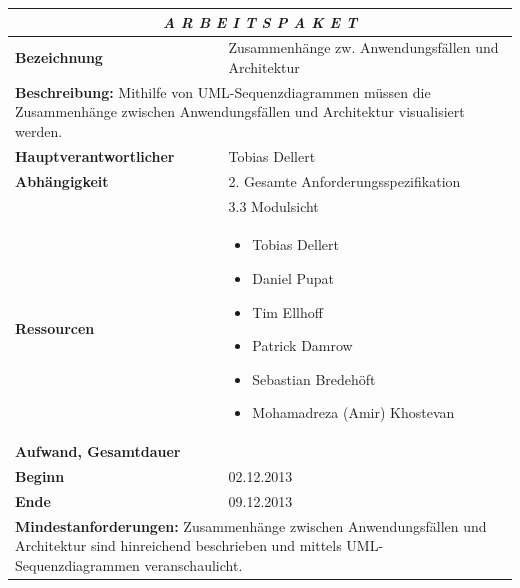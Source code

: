 \documentclass[fontsize=12pt,paper=a4,twoside]{scrartcl}
\begin{document}
\begin{tabular}{p{7.5cm}|p{7.5cm}}\toprule
\multicolumn{2}{c}{\textbf{\textit{A R B E I T S P A K E T \quad 3.6}}} \\ \toprule \hline
\textbf{Bezeichnung} & Zusammenhänge zw. Anwendungsfällen und Architektur\\\hline
\multicolumn{2}{p{15cm}}{\textbf{Beschreibung:} \newline 
Mithilfe von UML-Sequenzdiagrammen müssen die Zusammenhänge zwischen Anwendungsfällen und Architektur visualisiert werden. }  \\\hline
\textbf{Hauptverantwortlicher} & Tobias Dellert \\\hline
\textbf{Abhängigkeit} & 2. Gesamte Anforderungsspezifikation \\
& 3.3 Modulsicht \\\hline
\textbf{Ressourcen} & \begin{itemize} 
\itemsep0pt
\item Tobias Dellert
\item Daniel Pupat
\item Tim Ellhoff
\item Patrick Damrow
\item Sebastian Bredehöft
\item Mohamadreza (Amir) Khostevan
\end{itemize} \\\hline
\textbf{Aufwand, Gesamtdauer} & \\\hline
\textbf{Beginn} & 02.12.2013 \\\hline
\textbf{Ende} & 09.12.2013\\\hline
\multicolumn{2}{p{15cm}}{\textbf{Mindestanforderungen: } \newline
Zusammenhänge zwischen Anwendungsfällen und Architektur sind hinreichend beschrieben und mittels UML-Sequenzdiagrammen veranschaulicht.}  \\ \toprule
\end{tabular} \\\\
\end{document}
